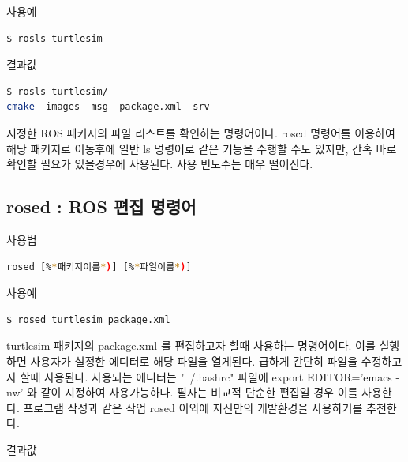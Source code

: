 \noindent
{}\circled{\thenum} 사용예
\begin{lstlisting}[language=bash]
$ rosls turtlesim
\end{lstlisting}

\noindent
{}\circled{\thenum} 결과값
\begin{lstlisting}[language=bash]
$ rosls turtlesim/
cmake  images  msg  package.xml  srv
\end{lstlisting}

\vspace{\baselineskip}
\noindent
지정한 ROS 패키지의 파일 리스트를 확인하는 명령어이다. roscd 명령어를 이용하여 해당 패키지로 이동후에 일반 ls 명령어로 같은 기능을 수행할 수도 있지만, 간혹 바로 확인할 필요가 있을경우에 사용된다. 사용 빈도수는 매우 떨어진다.

\subsection{rosed : ROS 편집 명령어}

\setcounter{num}{0}

\circled{\thenum} 사용법
\begin{lstlisting}[language=bash]
rosed [%*패키지이름*)] [%*파일이름*)]
\end{lstlisting}

\noindent
{}\circled{\thenum} 사용예
\begin{lstlisting}[language=bash]
$ rosed turtlesim package.xml 
\end{lstlisting}

\vspace{\baselineskip}
\noindent
turtlesim 패키지의 package.xml 를 편집하고자 할때 사용하는 명령어이다. 이를 실행하면 사용자가 설정한 에디터로 해당 파일을 열게된다. 급하게 간단히 파일을 수정하고자 할때 사용된다. 사용되는 에디터는 "~/.bashrc" 파일에 export EDITOR='emacs -nw' 와 같이 지정하여 사용가능하다. 필자는 비교적 단순한 편집일 경우 이를 사용한다. 프로그램 작성과 같은 작업 rosed 이외에 자신만의 개발환경을 사용하기를 추천한다.

\vspace{\baselineskip}
\noindent
{}\circled{\thenum} 결과값
\begin{lstlisting}[language=bash]
%*사용자가 지정해둔 에디터를 이용하여 해당 파일을 열게된다.*)
\end{lstlisting}

